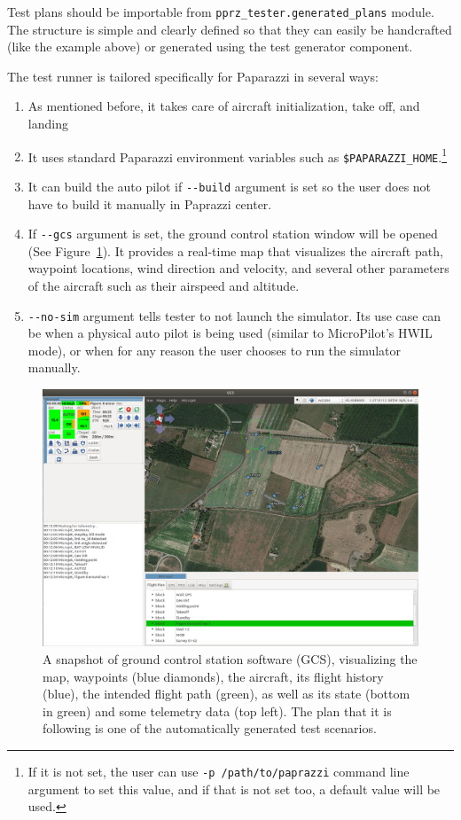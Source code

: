 Test plans should be importable from \verb|pprz_tester.generated_plans| module. The structure is simple and clearly defined so that they can easily be handcrafted (like the example above) or generated using the test generator component.

The test runner is tailored specifically for Paparazzi in several ways:
\begin{enumerate}
    \item %
As mentioned before, it takes care of aircraft initialization, take off, and landing
    \item %
It uses standard Paparazzi environment variables such as \verb|$PAPARAZZI_HOME|.\footnote{If it is not set, the user can use \texttt{-p /path/to/paprazzi} command line argument to set this value, and if that is not set too, a default value will be used.} 
    \item %
It can build the auto pilot if \verb|--build| argument is set so the user does not have to build it manually in Paprazzi center. 

    \item %
If \verb|--gcs| argument is set, the ground control station window will be opened (See Figure~\ref{fig:paparazzi_gcs}). It provides a real-time map that visualizes the aircraft path, waypoint locations, wind direction and velocity, and several other parameters of the aircraft such as their airspeed and altitude. 
    \item %
\verb|--no-sim| argument tells tester to not launch the simulator. Its use case can be when a physical auto pilot is being used (similar to MicroPilot's HWIL mode), or when for any reason the user chooses to run the simulator manually. 
\end{enumerate}

\begin{figure}
    \centering
    \includegraphics[width=\textwidth]{4_files/GCS.png}
    \caption{A snapshot of ground control station software (GCS), visualizing the map, waypoints (blue diamonds), the aircraft, its flight history (blue), the intended flight path (green), as well as its state (bottom in green) and some telemetry data (top left). The plan that it is following is one of the automatically generated test scenarios.}
    \label{fig:paparazzi_gcs}
\end{figure}

